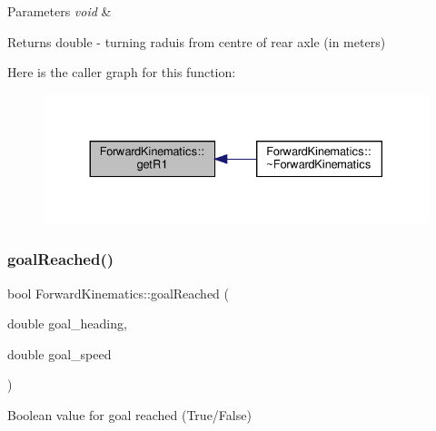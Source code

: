 \begin{DoxyParams}{Parameters}
{\em void} & \\
\hline
\end{DoxyParams}
\begin{DoxyReturn}{Returns}
double -\/ turning raduis from centre of rear axle (in meters) 
\end{DoxyReturn}
Here is the caller graph for this function\+:
\nopagebreak
\begin{figure}[H]
\begin{center}
\leavevmode
\includegraphics[width=330pt]{classForwardKinematics_a6fdaaf30015b1628efed2407ea13c780_icgraph}
\end{center}
\end{figure}
\mbox{\label{classForwardKinematics_ab5b26d5bc5c63148a7efa8361a851066}} 
\subsubsection{\texorpdfstring{goal\+Reached()}{goalReached()}}
{\footnotesize\ttfamily bool Forward\+Kinematics\+::goal\+Reached (\begin{DoxyParamCaption}\item[{double}]{goal\+\_\+heading,  }\item[{double}]{goal\+\_\+speed }\end{DoxyParamCaption})}



Boolean value for goal reached (True/\+False) 


